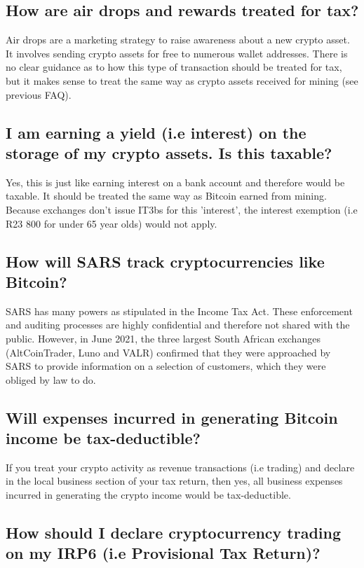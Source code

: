\subsection{How are air drops and rewards treated for tax?}

Air drops are a marketing strategy to raise awareness about a new crypto asset. It involves sending crypto assets for free to numerous wallet addresses. There is no clear guidance as to how this type of transaction should be treated for tax, but it makes sense to treat  the same way as crypto assets received for mining (see previous FAQ).

\subsection{I am earning a yield (i.e interest) on the storage of my crypto assets.  Is this taxable?}

Yes, this is just like earning interest on a bank account and therefore would be taxable. It should be treated the same way as Bitcoin earned from mining. Because exchanges don't issue IT3bs for this 'interest', the interest exemption  (i.e R23 800 for under 65 year olds) would not apply.

\subsection{How will SARS track cryptocurrencies like Bitcoin?}

SARS has many powers as stipulated in the Income Tax Act. These enforcement and auditing processes are highly confidential and therefore not shared with the public. However, in June 2021, the three largest South African exchanges (AltCoinTrader, Luno and VALR) confirmed that they were approached by SARS to provide information on a selection of customers, which they were obliged by law to do.


\subsection{Will expenses incurred in generating Bitcoin income be tax-deductible?}

If you treat your crypto activity as revenue transactions (i.e trading) and declare in the local business section of your tax return,  then yes, all business expenses incurred in generating the crypto income would be tax-deductible.

\subsection{How should I declare cryptocurrency trading on my IRP6 (i.e Provisional Tax Return)?}

